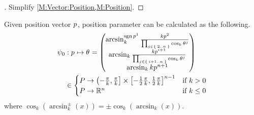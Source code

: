 \documentclass[stu, babel, american, biblatex, a4paper, leqno, draftall]{apa7}
\begin{document}
\begin{proof}[]
    Simplify \cref{M:Vector:Position,M:Position}.
\end{proof}
\begin{lemma}\label{M:Parameter:Value}
    Given position vector $\tensor{p}{}$, position parameter can be calculated as the following.
    \begin{align*}
        \psi_0
         & : \tensor{p}{} \mapsto \tensor{\theta}{}
        =
        \begin{pmatrix}
            \arcsin_k^{\sign{\tensor{p}{^1}}}{\frac{k\tensor{p}{^2}}{\prod_{j\in\Set{2..n}}{\cos_k{\tensor{\theta}{^j}}}}} \\
            \arcsin_k{\frac{k\tensor{p}{^{i+1}}}{\prod_{j\in\Set{i+1..n}}{\cos_k{\tensor{\theta}{^j}}}}}                   \\
            \arcsin_k{k\tensor{p}{^{n+1}}}                                                                                 \\
        \end{pmatrix} \\
         & \in
        \begin{cases}
            P \to \left(-\frac{\pi}{k}, \frac{\pi}{k}\right]\times\left[-\frac{1}{2}\frac{\pi}{k}, \frac{1}{2}\frac{\pi}{k}\right]^{n-1} & \text{if $k>0$}   \\
            P \to \R^{n}                                                                                                                 & \text{if $k\le0$} \\
        \end{cases}
    \end{align*}
    where $\cos_k\left(\arcsin_k^{\pm}\left(x\right)\right) = \pm \cos_k\left(\arcsin_k\left(x\right)\right)$.
\end{lemma}
\end{document}

